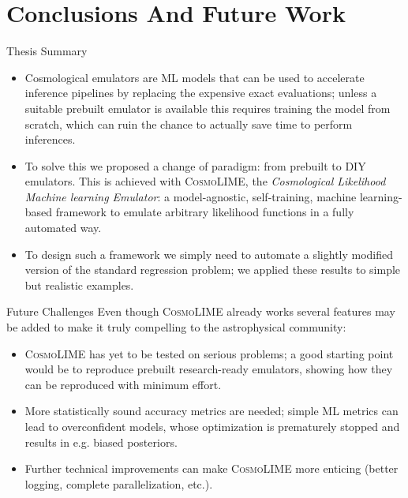 \documentclass[aspectratio=43,xcolor=svgnames]{beamer} %
\begin{document}
\section{Conclusions And Future Work}
\begin{frame}{Thesis Summary}
\begin{itemize}[<+->]
    \item Cosmological emulators are ML models that can be used to accelerate inference pipelines by replacing the expensive exact evaluations; unless a suitable prebuilt emulator is available this requires training the model from scratch, which can ruin the chance to actually save time to perform inferences.
    \item To solve this we proposed a change of paradigm: from prebuilt to DIY emulators. This is achieved with \textsc{CosmoLIME}, the \emph{Cosmological Likelihood Machine learning Emulator}: a model-agnostic, self-training, machine learning-based framework to emulate arbitrary likelihood functions in a fully automated way.
    \item To design such a framework we simply need to automate a slightly modified version of the standard regression problem; we applied these results to simple but realistic examples.
\end{itemize}
\end{frame}
\begin{frame}{Future Challenges}
Even though \textsc{CosmoLIME} already works several features may be added to make it truly compelling to the astrophysical community:
\pause
\begin{itemize}[<+->]
    \item \textsc{CosmoLIME} has yet to be tested on serious problems; a good starting point would be to reproduce prebuilt research-ready emulators, showing how they can be reproduced with minimum effort.
    \item More statistically sound accuracy metrics are needed; simple ML metrics can lead to overconfident models, whose optimization is prematurely stopped and results in e.g. biased posteriors.
    \item Further technical improvements can make \textsc{CosmoLIME} more enticing (better logging, complete parallelization, etc.).
\end{itemize}
\end{frame}
\end{document}
